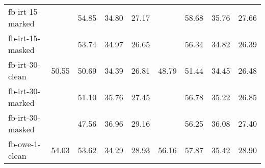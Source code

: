 \begin{tabular}{| l | r | r | r | r | r | r | r | r |}
    fb-irt-15-marked   &       & 54.85 & 34.80 & 27.17 &       & 58.68 & 35.76 & 27.66 \\
    fb-irt-15-masked   &       & 53.74 & 34.97 & 26.65 &       & 56.34 & 34.82 & 26.39 \\ \hline
    fb-irt-30-clean    & 50.55 & 50.69 & 34.39 & 26.81 & 48.79 & 51.44 & 34.45 & 26.48 \\
    fb-irt-30-marked   &       & 51.10 & 35.76 & 27.45 &       & 56.78 & 35.22 & 26.85 \\
    fb-irt-30-masked   &       & 47.56 & 36.96 & 29.16 &       & 56.25 & 36.08 & 27.40 \\ \hline
    fb-owe-1-clean     & 54.03 & 53.62 & 34.29 & 28.93 & 56.16 & 57.87 & 35.42 & 28.90 \\ \hline
    
\end{tabular}
